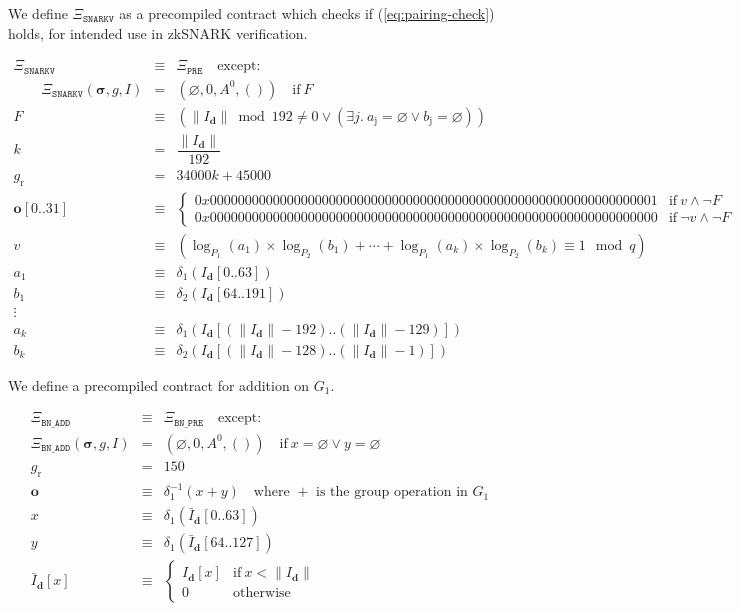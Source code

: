\documentclass[9pt,oneside]{amsart}
\begin{document}
We define $\Xi_{\mathtt{SNARKV}}$ as a precompiled contract which checks if (\ref{eq:pairing-check}) holds, for intended use in zkSNARK verification.

\begin{eqnarray}
\Xi_{\mathtt{SNARKV}}&\equiv&\Xi_{\mathtt{PRE}}\quad\text{except:}\\
\qquad\Xi_{\mathtt{SNARKV}}(\boldsymbol\sigma,g,I)&=&\left(\varnothing,0,A^0,()\right)\quad\text{if}\ F\\
F&\equiv&(\lVert I_{\mathbf{d}} \rVert\bmod 192\neq 0\vee(\exists j.\ a_{\mathrm{j}}=\varnothing\vee b_{\mathrm{j}}=\varnothing))\\
k &=& \dfrac{\lVert I_{\mathbf{d}} \rVert}{192} \\
g_{\mathrm{r}}&=& 34000k + 45000 \\
\mathbf{o}[0..31]&\equiv&\begin{cases}
0x0000000000000000000000000000000000000000000000000000000000000001&\text{if}\ v\wedge\neg F\\
0x0000000000000000000000000000000000000000000000000000000000000000&\text{if}\ \neg v\wedge\neg F
\end{cases}\\
v&\equiv&(\log_{P_1}(a_1)\times\log_{P_2}(b_1)+\cdots+\log_{P_1}(a_k)\times\log_{P_2}(b_k)\equiv 1\mod q)\\
a_1&\equiv&\delta_1(I_{\mathbf{d}}[0..63])\\
b_1&\equiv&\delta_2(I_{\mathbf{d}}[64..191])\\\nonumber
\vdots\\
a_k&\equiv&\delta_1(I_{\mathbf{d}}[(\lVert I_{\mathbf{d}} \rVert-192)..(\lVert I_{\mathbf{d}} \rVert-129)])\\
b_k&\equiv&\delta_2(I_{\mathbf{d}}[(\lVert I_{\mathbf{d}} \rVert-128)..(\lVert I_{\mathbf{d}} \rVert-1)])
\end{eqnarray}

We define a precompiled contract for addition on $G_1$.

\begin{eqnarray}
\Xi_{\mathtt{BN\_ADD}}&\equiv&\Xi_{\mathtt{BN\_PRE}}\quad\text{except:}\\
\Xi_{\mathtt{BN\_ADD}}(\boldsymbol\sigma,g,I)&=&\left(\varnothing,0,A^0,()\right)\quad\text{if}\ x=\varnothing\vee y=\varnothing\\
g_{\mathrm{r}} &=& 150\\
\mathbf{o}&\equiv&\delta_1^{-1}(x+y)\quad\text{where $+$ is the group operation in $G_1$}\\
x&\equiv&\delta_1\left(\bar I_{\mathbf{d}}[0..63]\right)\\
y&\equiv&\delta_1\left(\bar I_{\mathbf{d}}[64..127]\right)\\
\label{eq:complemented_input}\bar I_{\mathbf{d}}[x]&\equiv&\begin{cases}
I_{\mathbf{d}}[x]&\text{if}\ x < \lVert I_{\mathbf{d}} \rVert\\
0&\text{otherwise}
\end{cases}
\end{eqnarray}
\end{document}
